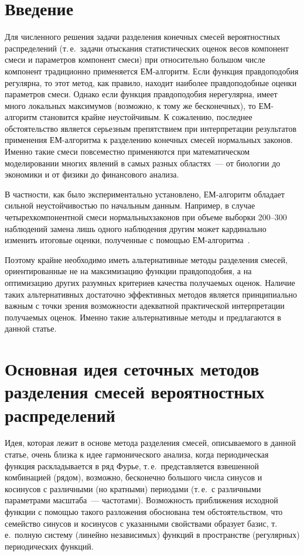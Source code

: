       \begin{multicols}{2}

      \label{st\stat}

\section{Введение}

Для численного решения задачи разделения конечных смесей
вероятностных распределений (т.\,е.\ задачи отыскания
статистических оценок весов компонент смеси и параметров компонент
смеси) при относительно большом числе компонент традиционно
применяется ЕМ-алгоритм. Если функция правдоподобия регулярна, то
этот метод, как правило, находит наиболее правдоподобные оценки
параметров смеси. Однако если функция правдоподобия нерегулярна,
имеет много локальных максимумов (возможно, к тому же
бесконечных), то ЕМ-алгоритм становится крайне неустойчивым. К
сожалению, последнее обстоятельство является серьезным
препятствием при интерпретации результатов применения ЕМ-алгоритма
к разделению конечных смесей нормальных законов. Именно такие
смеси повсеместно применяются при математическом моделировании
многих явлений в самых разных областях~--- от биологии до экономики
и от физики до финансового анализа.

В частности, как было экспериментально установлено, ЕМ-алгоритм
обладает сильной неустойчивостью по начальным данным. Например, в
случае четырехкомпонентной смеси нормальных\linebreak законов при объеме
выборки 200--300 наблюдений замена лишь одного наблюдения другим
может кардинально изменить итоговые оценки, полученные с помощью
ЕМ-алгоритма~\cite{1k}.

Поэтому крайне необходимо иметь альтернативные методы разделения
смесей, ориентированные не на максимизацию функции правдоподобия,
а на оптимизацию других разумных критериев качества получаемых
оценок. Наличие таких альтернативных достаточно эффективных
методов является принципиально важным с точки зрения возможности
адекватной практической интерпретации получаемых оценок. Именно
такие альтернативные методы и предлагаются в данной статье.

\section{Основная идея сеточных методов разделения
смесей вероятностных распределений}

Идея, которая лежит в основе метода разделения смесей,
описываемого в данной статье, очень близка к идее гармонического
анализа, когда периодическая функция раскладывается в ряд Фурье,
т.\,е.\ представляется взвешенной комбинацией (рядом), возможно,
бесконечно большого числа синусов и косинусов с различными (но
кратными) периодами (т.\,е.\ с различными параметрами масштаба~---
частотами). Возможность приближения исходной функции с помощью
такого разложения обоснована тем обстоятельством, что семейство
синусов и косинусов с указанными свойствами образует базис, т.\,е.\
полную систему (линейно независимых) функций в пространстве
(регулярных) периодических функций.


\end{multicols}
